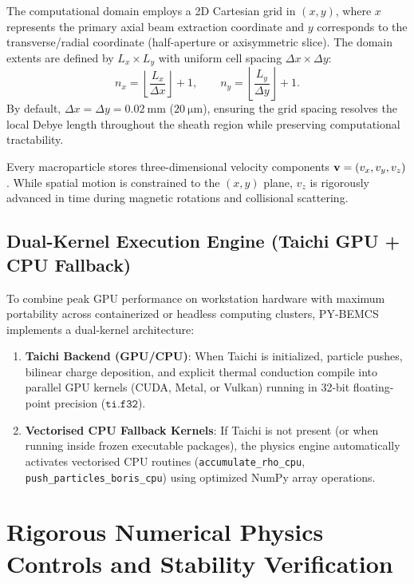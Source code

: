 \documentclass[11pt,a4paper]{article}
\newcommand{\PYBEMCS}{PY-BEMCS}
\begin{document}
The computational domain employs a 2D Cartesian grid in $(x, y)$, where $x$ represents the primary axial beam extraction coordinate and $y$ corresponds to the transverse/radial coordinate (half-aperture or axisymmetric slice). The domain extents are defined by $L_x \times L_y$ with uniform cell spacing $\Delta x \times \Delta y$:
\begin{equation}
    n_x = \left\lfloor\frac{L_x}{\Delta x}\right\rfloor + 1, \qquad
    n_y = \left\lfloor\frac{L_y}{\Delta y}\right\rfloor + 1.
\end{equation}
By default, $\Delta x = \Delta y = \SI{0.02}{\milli\meter}$ ($\SI{20}{\micro\meter}$), ensuring the grid spacing resolves the local Debye length throughout the sheath region while preserving computational tractability.

Every macroparticle stores three-dimensional velocity components $\vb{v} = (v_x, v_y, v_z)$. While spatial motion is constrained to the $(x, y)$ plane, $v_z$ is rigorously advanced in time during magnetic rotations and collisional scattering.

\subsection{Dual-Kernel Execution Engine (Taichi GPU + CPU Fallback)}

To combine peak GPU performance on workstation hardware with maximum portability across containerized or headless computing clusters, \PYBEMCS{} implements a dual-kernel architecture:
\begin{enumerate}[nosep]
    \item \textbf{Taichi Backend (GPU/CPU)}: When Taichi is initialized, particle pushes, bilinear charge deposition, and explicit thermal conduction compile into parallel GPU kernels (CUDA, Metal, or Vulkan) running in 32-bit floating-point precision ($\texttt{ti.f32}$).
    \item \textbf{Vectorised CPU Fallback Kernels}: If Taichi is not present (or when running inside frozen executable packages), the physics engine automatically activates vectorised CPU routines (\texttt{accumulate\_rho\_cpu}, \texttt{push\_particles\_boris\_cpu}) using optimized NumPy array operations.
\end{enumerate}

\section{Rigorous Numerical Physics Controls and Stability Verification}
\end{document}
